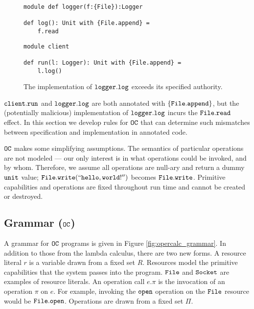 \begin{figure}[h]
\vspace{-5pt}

\begin{lstlisting}
module def logger(f:{File}):Logger

def log(): Unit with {File.append} =
    f.read
\end{lstlisting}

\begin{lstlisting}
module client

def run(l: Logger): Unit with {File.append} =
    l.log()
\end{lstlisting}

\vspace{-7pt}
\caption{The implementation of $\mathtt{logger.log}$ exceeds its specified authority.}
\label{fig:opercalc_motivating}
\end{figure}

$\mathtt{client.run}$ and $\mathtt{logger.log}$ are both annotated with $\{ \mathtt{File.append} \}$, but the (potentially malicious) implementation of $\mathtt{logger.log}$ incurs the $\mathtt{File.read}$ effect.
In this section we develop rules for $\mathtt{OC}$ that can determine such mismatches between specification and implementation in annotated code.

$\mathtt{OC}$ makes some simplifying assumptions.
The semantics of particular operations are not modeled --- our only interest is in what operations could be invoked, and by whom.
Therefore, we assume all operations are null-ary and return a dummy $\mathtt{unit}$ value; $\mathtt{File.write(``hello, world!'')}$ becomes $\mathtt{File.write}$.
Primitive capabilities and operations are fixed throughout run time and cannot be created or destroyed.

\subsection{Grammar ($\mathtt{OC}$)}

A grammar for $\mathtt{OC}$ programs is given in Figure \ref{fig:opercalc_grammar}. In addition to those from the lambda calculus, there are two new forms. A resource literal $r$ is a variable drawn from a fixed set $R$. Resources model the primitive capabilities that the system passes into the program. $\mathtt{File}$ and $\mathtt{Socket}$ are examples of resource literals. An operation call $e.\pi$ is the invocation of an operation $\pi$ on $e$. For example, invoking the $\mathtt{open}$ operation on the $\mathtt{File}$ resource would be $\mathtt{File.open}$. Operations are drawn from a fixed set $\Pi$.

